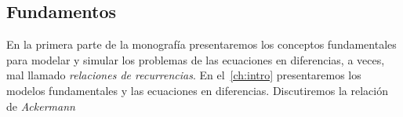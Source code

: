 \begin{partbacktext}
	\part{Fundamentos}
	En la primera parte de la monografía presentaremos los conceptos fundamentales para modelar y simular los problemas de las ecuaciones en diferencias, a veces, mal llamado \emph{relaciones de recurrencias}. En el~\autoref{ch:intro} presentaremos los modelos fundamentales y las ecuaciones en diferencias. Discutiremos la relación de \emph{Ackermann}
\end{partbacktext}
